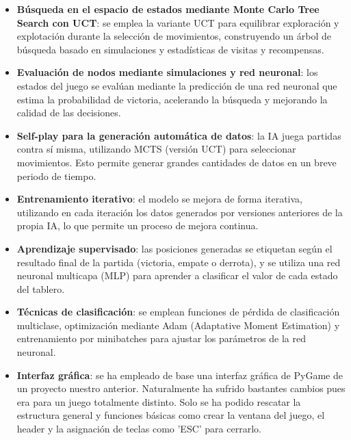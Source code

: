 \documentclass[conference,a4paper]{IEEEtran}
\begin{document}
\begin{itemize}
    \item \textbf{Búsqueda en el espacio de estados mediante Monte Carlo Tree Search con UCT}: se emplea la variante UCT para equilibrar exploración y explotación durante la selección de movimientos, construyendo un árbol de búsqueda basado en simulaciones y estadísticas de visitas y recompensas.
    
    \item \textbf{Evaluación de nodos mediante simulaciones y red neuronal}: los estados del juego se evalúan mediante la predicción de una red neuronal que estima la probabilidad de victoria, acelerando la búsqueda y mejorando la calidad de las decisiones.
    
    \item \textbf{Self-play para la generación automática de datos}: la IA juega partidas contra sí misma, utilizando MCTS (versión UCT) para seleccionar movimientos. Esto permite generar grandes cantidades de datos en un breve periodo de tiempo.
    
    \item \textbf{Entrenamiento iterativo}: el modelo se mejora de forma iterativa, utilizando en cada iteración los datos generados por versiones anteriores de la propia IA, lo que permite un proceso de mejora continua.
    
    \item \textbf{Aprendizaje supervisado}: las posiciones generadas se etiquetan según el resultado final de la partida (victoria, empate o derrota), y se utiliza una red neuronal multicapa (MLP) para aprender a clasificar el valor de cada estado del tablero.
    
    \item \textbf{Técnicas de clasificación}: se emplean funciones de pérdida de clasificación multiclase, optimización mediante Adam (Adaptative Moment Estimation) y entrenamiento por minibatches para ajustar los parámetros de la red neuronal.

    \item \textbf{Interfaz gráfica}: se ha empleado de base una interfaz gráfica de PyGame de un proyecto nuestro anterior. Naturalmente ha sufrido bastantes cambios pues era para un juego totalmente distinto. Solo se ha podido rescatar la estructura general y funciones básicas como crear la ventana del juego, el header y la asignación de teclas como 'ESC' para cerrarlo.
\end{itemize}
\end{document}
